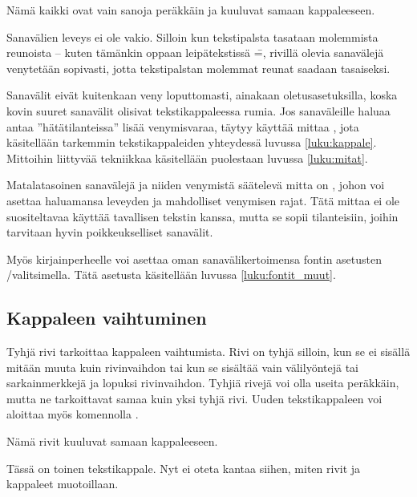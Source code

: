 \begin{tulossis}
  Nämä kaikki ovat vain sanoja peräkkäin ja kuuluvat samaan
  kappaleeseen.
\end{tulossis}

Sanavälien leveys ei ole vakio. Silloin kun tekstipalsta tasataan
molemmista reunoista -- kuten tämänkin oppaan leipätekstissä \==,
rivillä olevia sanavälejä venytetään sopivasti, jotta tekstipalstan
molemmat reunat saadaan tasaiseksi.

Sanavälit eivät kuitenkaan veny loputtomasti, ainakaan
oletusasetuksilla, koska kovin suuret sanavälit olisivat
tekstikappaleessa rumia. Jos sanaväleille haluaa antaa
''hätätilanteissa'' lisää venymisvaraa, täytyy käyttää mittaa
, jota käsitellään tarkemmin
tekstikappaleiden yhteydessä luvussa \ref{luku:kappale}. Mittoihin
liittyvää tekniikkaa käsitellään puolestaan luvussa \ref{luku:mitat}.

Matalatasoinen sanavälejä ja niiden venymistä säätelevä mitta on
, johon voi asettaa haluamansa leveyden ja
mahdolliset venymisen rajat. Tätä mittaa ei ole suositeltavaa käyttää
tavallisen tekstin kanssa, mutta se sopii tilanteisiin, joihin tarvitaan
hyvin poikkeukselliset sanavälit.

\begin{koodilohkosis}
  \setlength{\spaceskip}{0.8em plus 0.3em minus 0.2em}
\end{koodilohkosis}

Myös kirjainperheelle voi asettaa oman sanavälikertoimensa fontin
asetusten \-/valitsimella. Tätä asetusta käsitellään
luvussa \ref{luku:fontit_muut}.

\subsection{Kappaleen vaihtuminen}
\label{luku:kappaleen_vaihtuminen}

Tyhjä rivi tarkoittaa kappaleen vaihtumista. Rivi on tyhjä silloin, kun
se ei sisällä mitään muuta kuin rivinvaihdon tai kun se sisältää vain
välilyöntejä tai sarkainmerkkejä ja lopuksi rivinvaihdon. Tyhjiä rivejä
voi olla useita peräkkäin, mutta ne tarkoittavat samaa kuin yksi tyhjä
rivi. Uuden tekstikappaleen voi aloittaa myös komennolla .

\begin{koodilohkosis}
  Nämä rivit kuuluvat
  samaan kappaleeseen.

  Tässä on toinen tekstikappale.
  Nyt ei oteta kantaa siihen, miten
  rivit ja kappaleet muotoillaan.
\end{koodilohkosis}

